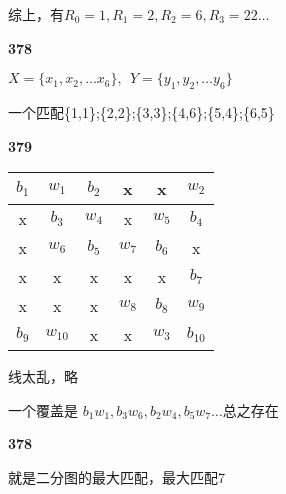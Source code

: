 \documentclass[UTF8]{ctexart}
\begin{document}
    综上，有$R_0 = 1, R_1 = 2, R_2 = 6, R_3 = 22\dots$

    \noindent\textbf{378}

    $X=\{x_1,x_2,\dots x_6\},~~Y=\{y_1,y_2,\dots y_6\}$

    \usetikzlibrary {graphs.standard}


    一个匹配\{1,1\};\{2,2\};\{3,3\};\{4,6\};\{5,4\};\{6,5\}

    \noindent\textbf{379}



\begin{table}[h]
    \centering
    \begin{tabular}{|c|c|c|c|c|c|} 
    \toprule
    $b_1$ & $w_1$ & $b_2$& x & x & $w_2$  \\ 
    \hline
    x & $b_3$ & $w_4$ & x & $w_5$ & $b_4$  \\ 
    \hline
    x & $w_6$ & $b_5$ & $w_7$ & $b_6$ & x  \\ 
    \hline
    x & x & x & x & x & $b_7$  \\ 
    \hline
    x & x & x &$ w_8$ & $b_8$ & $w_9$  \\ 
    \hline
    $b_9$ & $w_{10}$ & x & x & $w_3$ & $b_{10}$  \\
    \bottomrule
    \end{tabular}
    \end{table}

    线太乱，略

    一个覆盖是 $b_1w_1,b_3w_6,b_2w_4,b_5w_7\dots$总之存在

    \noindent\textbf{378}

    就是二分图的最大匹配，最大匹配7
\end{document}
